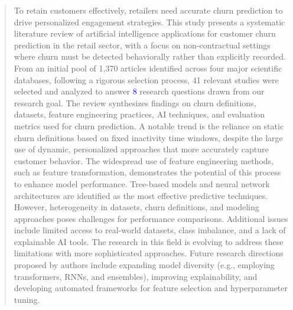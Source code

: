 \documentclass[preprint,12pt]{elsarticle}
\newcommand{\DD}[2]{\textcolor{blue}{#1}[\textcolor{red}{#2}]}
\begin{document}
\begin{frontmatter}
\begin{abstract}
\noindent To retain customers effectively, retailers need accurate churn prediction to drive personalized engagement strategies. This study presents a systematic literature review of artificial intelligence applications for customer churn prediction in the retail sector, with a focus on non-contractual settings where churn must be detected behaviorally rather than explicitly recorded. From an initial pool of 1,370 articles identified across four major scientific databases, following a rigorous selection process, 41 relevant studies were selected and analyzed to answer \textcolor{blue}{8} research questions drawn from our research goal. The review synthesizes findings on churn definitions, datasets, feature engineering practices, AI techniques, and evaluation metrics used for churn prediction. A notable trend is the reliance on static churn definitions based on fixed inactivity time windows, despite the large use of dynamic, personalized approaches that more accurately capture customer behavior. The widespread use of feature engineering methods, such as feature transformation, demonstrates the potential of this process to enhance model performance.
Tree-based models and neural network architectures are identified as the most effective predictive techniques. However, heterogeneity in datasets, churn definitions, and modeling approaches poses challenges for performance comparisons. Additional issues include limited access to real-world datasets, class imbalance, and a lack of explainable AI tools. The research in this field is evolving to address these limitations with more sophisticated approaches. Future research directions proposed by authors include expanding model diversity (e.g., employing transformers, RNNs, and ensembles), improving explainability, and developing automated frameworks for feature selection and hyperparameter tuning.











\end{abstract}
\end{frontmatter}
\end{document}
